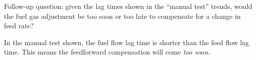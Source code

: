 \vskip 10pt

Follow-up question: given the lag times shown in the ``manual test'' trends, would the fuel gas adjustment be too soon or too late to compensate for a change in feed rate?







In the manual test shown, the fuel flow lag time is shorter than the feed flow lag time.  This means the feedforward compensation will come {\it too soon}.




